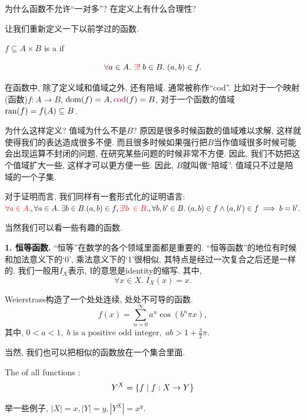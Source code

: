 \begin{bonus}
    为什么函数不允许``一对多''? 在定义上有什么合理性?
\end{bonus}

让我们重新定义一下以前学过的函数. 

\begin{definition}[Function]
    $f \subseteq A \times B$ is a   if

    \[
      \textcolor{red}{\forall} a \in A.\; \textcolor{red}{\exists!} \;b \in B.\; (a, b) \in f.
    \]
\end{definition}

在函数中, 除了定义域和值域之外, 还有陪域. 通常被称作``cod''. 比如对于一个映射(函数)$f: A \to B$, $\text{dom}(f) = A , \textcolor{purple}{\text{cod}}(f) = B$, 对于一个函数的值域$\text{ran}(f) = f(A) \subseteq B$. 

为什么这样定义? 值域为什么不是$B$? 原因是很多时候函数的值域难以求解, 这样就使得我们的表达造成很多不便. 而且很多时候如果强行把$B$当作值域很多时候可能会出现运算不封闭的问题, 在研究某些问题的时候非常不方便. 因此, 我们不妨把这个值域扩大一些, 这样才可以更方便一些. 因此, $B$就叫做``陪域''. 值域只不过是陪域的一个子集. 

对于证明而言, 我们同样有一套形式化的证明语言: 
$\textcolor{red}{\forall a \in A.}, \forall a \in A.\; \exists b \in B. (a, b) \in f, \textcolor{red}{\exists! b \;\in B.}, \forall b, b' \in B.\; (a, b) \in f \land (a, b') \in f \implies b = b'.$

当然我们可以看一些有趣的函数. 

\textbf{1. 恒等函数. } ``恒等''在数学的各个领域里面都是重要的. ``恒等函数''的地位有时候和加法意义下的`0', 乘法意义下的`1'很相似, 其特点是经过一次复合之后还是一样的. 我们一般用$I_X$表示, I的意思是identity的缩写. 其中, 
$$\forall x \in X.\; I_{X}(x) = x.$$

\begin{fun}
    Weierstrass构造了一个处处连续, 处处不可导的函数. 
    $$
    f(x)=\sum_{n=0} ^\infty a^n \cos(b^n \pi x),
    $$
    其中, $0 < a < 1,\; b \text{ is a positive odd integer},\; ab > 1+\frac{3}{2} \pi$. 
\end{fun}

当然, 我们也可以把相似的函数放在一个集合里面. 

\begin{definition}[$Y^{X}$]
    The  of all functions :
    \[
      Y^{X} = \{f \mid f: X \to Y\}
    \]
\end{definition}

举一些例子, $|X|=x, |Y|=y, |Y^X|=x^y$. 

